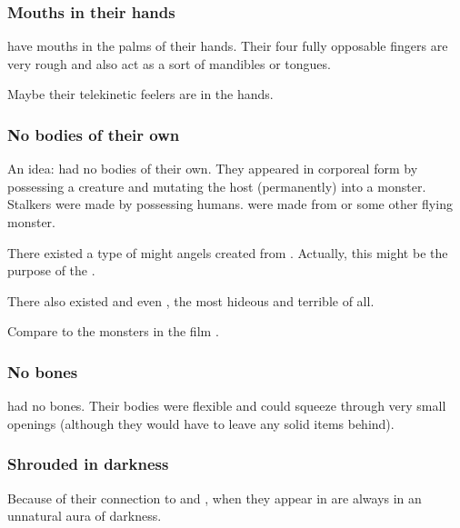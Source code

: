 \subsubsection{Mouths in their hands}
\Banes{} have mouths in the palms of their hands. 
Their four fully opposable fingers are very rough and also act as a sort of mandibles or tongues. 

Maybe their telekinetic feelers are in the hands. 





\subsubsection{No bodies of their own}
An idea:
\Banes had no bodies of their own.
They appeared in corporeal form by possessing a creature and mutating the host (permanently) into a \bane monster. 
Stalkers were made by possessing humans.
\Screamers were made from \lindworms or some other flying monster. 

There existed a type of might \bane angels created from \resphain.
Actually, this might be the purpose of the . 

There also existed \ophidian \banes and even \draconian \banes, the most hideous and terrible of all. 

Compare to the monsters in the film \cite{Movie:IntheMouthofMadness}. 





\subsubsection{No bones}
\Banes had no bones.
Their bodies were flexible and could squeeze through very small openings (although they would have to leave any solid items behind). 





\subsubsection{Shrouded in darkness}
Because of their connection to \Nyx{} and \Erebos, when they appear in \Miith{} \banes{} are always  in an unnatural aura of darkness. 






